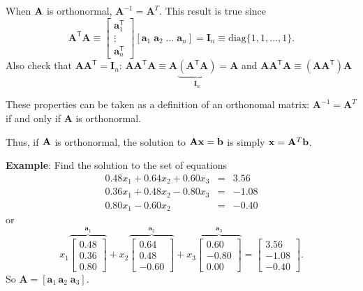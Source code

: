 When $\bf A$ is orthonormal,  $\mathbf A^{-1} = \mathbf A^{T}$.   This result is true since 
\[
\mathbf{A}^{\mathsf{T}}\mathbf{A} \equiv
\left[ \begin{array}{l} \mathbf{a}_1^{\mathsf{T}}\\ \vdots \\ \mathbf{a}_n^{\mathsf{T}}
\end{array}\right] \left[ \mathbf{a}_1 \; \mathbf{a}_2 \; \ldots \;\mathbf{a}_n \right] =
\mathbf{I}_n \equiv \mathrm{diag}\{1,1,\ldots,1\}.
\]
Also check that $\mathbf{A}\mathbf{A}^{\mathsf{T}} = \mathbf I_n$:  $\mathbf{A}\mathbf{A}^{\mathsf{T}}\mathbf{A} \equiv \mathbf{A}\underbrace{(\mathbf{A}^{\mathsf{T}}\mathbf{A})}_{\mathbf{I}_n}  = \mathbf{A}$ and $\mathbf{A}\mathbf{A}^{\mathsf{T}}\mathbf{A} \equiv (\mathbf{A}\mathbf{A}^{\mathsf{T}})\mathbf{A}$

These properties can be taken as a definition of an orthonomal matrix: $\mathbf A^{-1} = \mathbf A^{T}$ if and only if $\mathbf A$ is orthonormal. 

Thus, if $\bf A$ is orthonormal, the solution to $\mathbf{Ax} = \bf b$ is simply $\mathbf x = \mathbf A^T \bf b$.

\newpage

{\bf Example}: Find the solution to the set of equations 
\[\begin{array}{lcr}
0.48x_1 + 0.64x_2 + 0.60x_3 & = & 3.56\\
0.36x_1 + 0.48x_2 - 0.80x_3 & = & -1.08\\
0.80x_1 - 0.60x_2                    & = & -0.40
\end{array}\]
or
\[
x_1\overbrace{\left[\begin{array}{r}0.48\\0.36\\0.80\end{array}\right] }^{\mathbf{a}_1}+
x_2\overbrace{\left[\begin{array}{r}0.64\\0.48\\-0.60\end{array}\right]}^{\mathbf{a}_2} +
x_3\overbrace{\left[\begin{array}{r}0.60\\-0.80\\0.00\end{array}\right]}^{\mathbf{a}_3} =
       \left[\begin{array}{r}3.56\\-1.08\\-0.40\end{array}\right].
\]
So $\mathbf A = [\mathbf a_1 \, \mathbf a_2 \; \mathbf a_3 ]$. 

